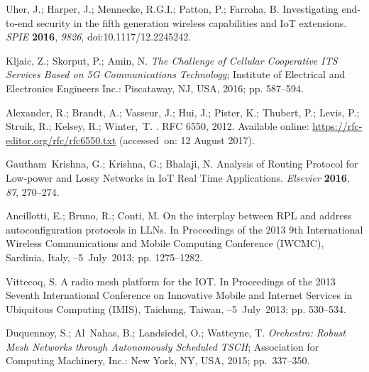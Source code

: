 \documentclass[symmetry,article,accept,moreauthors,pdftex10pt,a4paper]{mdpi}
\begin{document}
\begin{thebibliography}{999}
Uher, J.; Harper, J.; Mennecke, R.G.I.; Patton, P.; Farroha, B.
\newblock Investigating end-to-end security in the fifth generation wireless
capabilities and IoT extensions.
\newblock \emph{SPIE} \textbf{2016},\emph{ 9826}, doi:10.1117/12.2245242.

Kljaic, Z.; Skorput, P.; Amin, N.
\newblock \emph{The Challenge of Cellular Cooperative ITS Services Based on 5G
	Communications Technology};
\newblock Institute of Electrical and Electronics Engineers Inc.: Piscataway, NJ, USA, 2016; pp.
587--594.

Alexander, R.; Brandt, A.; Vasseur, J.; Hui, J.; Pister, K.; Thubert, P.;
Levis, P.; Struik, R.; Kelsey, R.; Winter,~T.
.
\newblock RFC 6550, 2012. Available online: \url{https://rfc-editor.org/rfc/rfc6550.txt} (accessed~on: 12 August 2017).

Gautham~Krishna, G.; Krishna, G.; Bhalaji, N.
\newblock Analysis of Routing Protocol for Low-power and Lossy Networks in IoT
Real Time Applications.
\newblock \emph{Elsevier} \textbf{2016}, \emph{87}, 270--274.

Ancillotti, E.; Bruno, R.; Conti, M.
\newblock On the interplay between RPL and address autoconfiguration protocols
in LLNs. In Proceedings of the 2013 9th International Wireless Communications and Mobile Computing Conference (IWCMC),  Sardinia, Italy, 
--5~July~2013; pp. 1275--1282.

Vittecoq, S.
\newblock A radio mesh platform for the IOT. In Proceedings of the 2013 Seventh International Conference on Innovative Mobile and Internet Services in Ubiquitous Computing (IMIS), Taichung, Taiwan,
--5~July~2013; pp. 530--534.

Duquennoy, S.; Al~Nahas, B.; Landsiedel, O.; Watteyne, T.
\newblock \emph{Orchestra: Robust Mesh Networks through Autonomously Scheduled TSCH};
\newblock Association for Computing Machinery, Inc.: New York, NY, USA, 2015; pp.~337--350.


\end{thebibliography}
\end{document}
